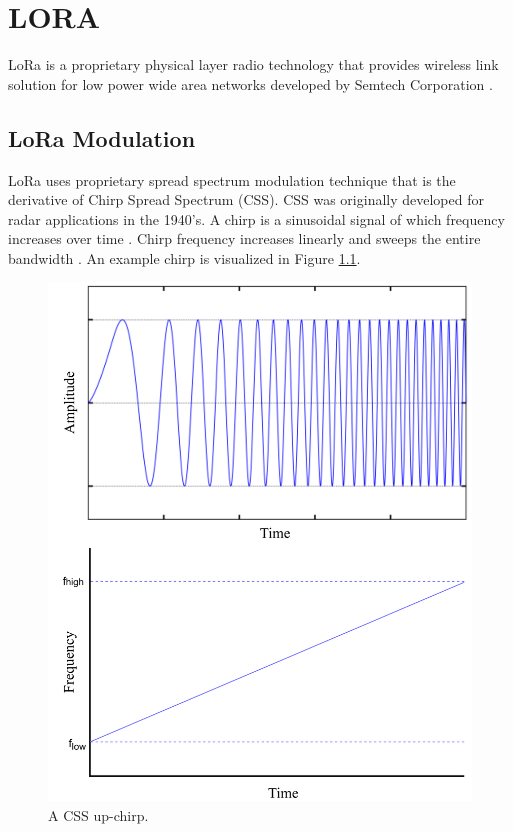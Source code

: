 \chapter{LORA}\label{ch:lora_lorawan}

LoRa is a proprietary physical layer radio technology that provides wireless link solution for low power wide area networks developed by Semtech Corporation \cite{semtech}.

\section{LoRa Modulation}

LoRa uses proprietary spread spectrum modulation technique that is the derivative of Chirp Spread Spectrum (CSS). CSS was originally developed for radar applications in the 1940’s. A chirp is a sinusoidal signal of which frequency increases over time \cite{1091721}. Chirp frequency increases linearly and sweeps the entire bandwidth \cite{AN1200.22}. An example chirp is visualized in Figure \ref{fig:lora_chirp}.

\begin{figure}[h]
\centering
\includegraphics[width=.7\linewidth]{fig/lora_chirp.png}
\vspace*{5mm}
\caption{A CSS up-chirp. \cite{sghoslya_lora}}
\label{fig:lora_chirp}
\end{figure}


